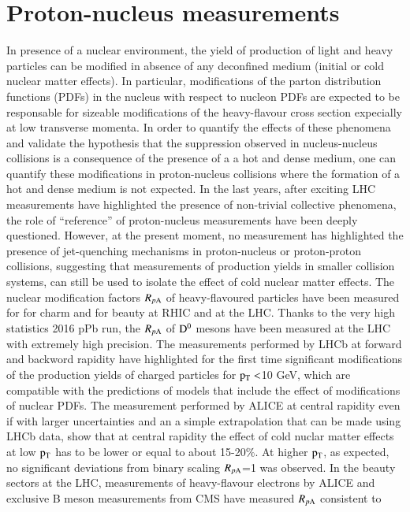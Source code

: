 \documentclass{webofc}
\begin{document}
\section{Proton-nucleus measurements}
\label{ppmeasurements}
In presence of a nuclear environment, the yield of production of light and heavy particles can be modified in absence of any deconfined medium (initial or cold nuclear matter effects). In particular, modifications of the 
parton distribution functions (PDFs) in the nucleus with respect to nucleon PDFs are expected to be responsable for sizeable modifications of the heavy-flavour cross section expecially at 
low transverse momenta. In order to quantify the effects of these phenomena and validate the hypothesis that the suppression observed in nucleus-nucleus collisions is a consequence of the presence of a a hot and dense medium, 
one can quantify these modifications in proton-nucleus collisions where the formation of a hot and dense medium is not expected. In the last years, after exciting LHC measurements have highlighted the presence of 
non-trivial collective phenomena, the role of ``reference'' of proton-nucleus measurements have been deeply questioned. However, at the present moment, no measurement has highlighted the presence of
jet-quenching mechanisms in proton-nucleus or proton-proton collisions, suggesting that measurements of production yields in smaller collision systems, can still be used to isolate the effect of cold nuclear matter effects.
The nuclear modification factors $R_{p \mathrm{A}}$ of heavy-flavoured particles have been measured for for charm and for beauty at RHIC and at the LHC. Thanks to the very high statistics 2016 pPb run, the $R_{p \mathrm{A}}$ of $\rm D^{0}$
mesons have been measured at the LHC with extremely high precision. The measurements performed by LHCb at forward and backword rapidity have highlighted for the first time significant modifications of the production 
yields of charged particles for $\rm p_{\rm T} <$10 GeV, which are compatible with the predictions of models that include the effect of modifications of nuclear PDFs. The measurement performed by ALICE at central rapidity even if with larger uncertainties 
and an a simple extrapolation that can be made using LHCb data, show that at central rapidity the effect of cold nuclar matter effects at low $\rm p_{\rm T} $ has to be lower or equal to about 15-20$\%$. At higher $\rm p_{\rm T} $, as expected, no significant deviations
from binary scaling $R_{p \mathrm{A}}$=1 was observed.  In the beauty sectors at the LHC, measurements of heavy-flavour electrons by ALICE and exclusive B meson measurements from CMS have measured $R_{p \mathrm{A}}$ consistent to 
\end{document}
